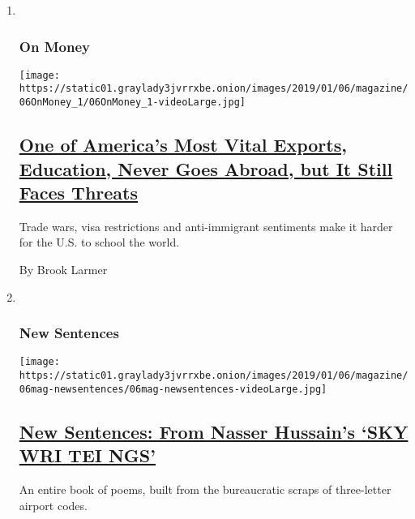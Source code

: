 \begin{enumerate}
\def\labelenumi{\arabic{enumi}.}
\item ~
  \hypertarget{on-money}{%
  \subsubsection{On Money}\label{on-money}}

  \texttt{[image: https://static01.graylady3jvrrxbe.onion/images/2019/01/06/magazine/06OnMoney\_1/06OnMoney\_1-videoLarge.jpg]}

  \hypertarget{one-of-americas-most-vital-exports-education-never-goes-abroad-but-it-still-faces-threats}{%
  \subsection{\texorpdfstring{\href{/2019/01/03/magazine/one-of-americas-most-vital-exports-education-never-goes-abroad-but-it-still-faces-threats.html}{One
  of America's Most Vital Exports, Education, Never Goes Abroad, but It
  Still Faces
  Threats}}{One of America's Most Vital Exports, Education, Never Goes Abroad, but It Still Faces Threats}}\label{one-of-americas-most-vital-exports-education-never-goes-abroad-but-it-still-faces-threats}}

  Trade wars, visa restrictions and anti-immigrant sentiments make it
  harder for the U.S. to school the world.

  By Brook Larmer
\item ~
  \hypertarget{new-sentences}{%
  \subsubsection{New Sentences}\label{new-sentences}}

  \texttt{[image: https://static01.graylady3jvrrxbe.onion/images/2019/01/06/magazine/06mag-newsentences/06mag-newsentences-videoLarge.jpg]}

  \hypertarget{new-sentences-from-nasser-hussains-sky-wri-tei-ngs}{%
  \subsection{\texorpdfstring{\href{/2019/01/03/magazine/new-sentences-from-nasser-hussains-sky-wri-tei-ngs.html}{New
  Sentences: From Nasser Hussain's `SKY WRI TEI
  NGS'}}{New Sentences: From Nasser Hussain's `SKY WRI TEI NGS'}}\label{new-sentences-from-nasser-hussains-sky-wri-tei-ngs}}

  An entire book of poems, built from the bureaucratic scraps of
  three-letter airport codes.


\end{enumerate}
